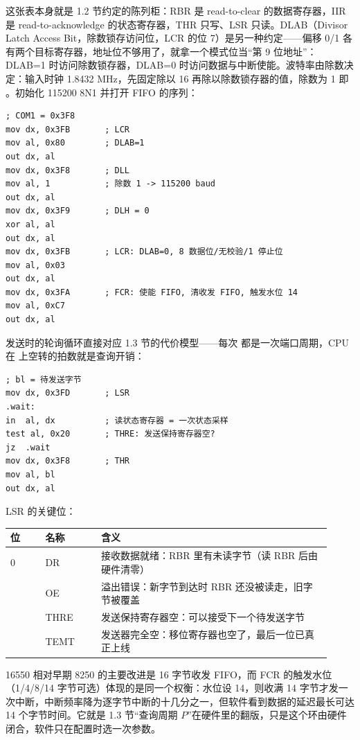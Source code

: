 这张表本身就是 1.2 节约定的陈列柜：RBR 是 read-to-clear 的数据寄存器，IIR 是 read-to-acknowledge 的状态寄存器，THR 只写、LSR 只读。DLAB（Divisor Latch Access Bit，除数锁存访问位，LCR 的位 7）是另一种约定——偏移 0/1 各有两个目标寄存器，地址位不够用了，就拿一个模式位当“第 9 位地址”：DLAB=1 时访问除数锁存器，DLAB=0 时访问数据与中断使能。波特率由除数决定：输入时钟 1.8432 MHz，先固定除以 16 再除以除数锁存器的值，除数为 1 即 。初始化 115200 8N1 并打开 FIFO 的序列：

\begin{lstlisting}
; COM1 = 0x3F8
mov dx, 0x3FB       ; LCR
mov al, 0x80        ; DLAB=1
out dx, al
mov dx, 0x3F8       ; DLL
mov al, 1           ; 除数 1 -> 115200 baud
out dx, al
mov dx, 0x3F9       ; DLH = 0
xor al, al
out dx, al
mov dx, 0x3FB       ; LCR: DLAB=0, 8 数据位/无校验/1 停止位
mov al, 0x03
out dx, al
mov dx, 0x3FA       ; FCR: 使能 FIFO, 清收发 FIFO, 触发水位 14
mov al, 0xC7
out dx, al
\end{lstlisting}

发送时的轮询循环直接对应 1.3 节的代价模型——每次  都是一次端口周期，CPU 在  上空转的拍数就是查询开销：

\begin{lstlisting}
; bl = 待发送字节
mov dx, 0x3FD       ; LSR
.wait:
in  al, dx          ; 读状态寄存器 = 一次状态采样
test al, 0x20       ; THRE: 发送保持寄存器空?
jz  .wait
mov dx, 0x3F8       ; THR
mov al, bl
out dx, al
\end{lstlisting}

LSR 的关键位：

\begin{longtable}{L{0.10\linewidth}L{0.16\linewidth}L{0.66\linewidth}}
\toprule
位 & 名称 & 含义 \\
 & DR & 接收数据就绪：RBR 里有未读字节（读 RBR 后由硬件清零） \\ & OE & 溢出错误：新字节到达时 RBR 还没被读走，旧字节被覆盖 \\ & THRE & 发送保持寄存器空：可以接受下一个待发送字节 \\ & TEMT & 发送器完全空：移位寄存器也空了，最后一位已真正上线 \\
\bottomrule
\end{longtable}

16550 相对早期 8250 的主要改进是 16 字节收发 FIFO，而 FCR 的触发水位（1/4/8/14 字节可选）体现的是同一个权衡：水位设 14，则收满 14 字节才发一次中断，中断频率降为逐字节中断的十几分之一，但软件看到数据的延迟最长可达 14 个字节时间。它就是 1.3 节“查询周期 $P$”在硬件里的翻版，只是这个环由硬件闭合，软件只在配置时选一次参数。


